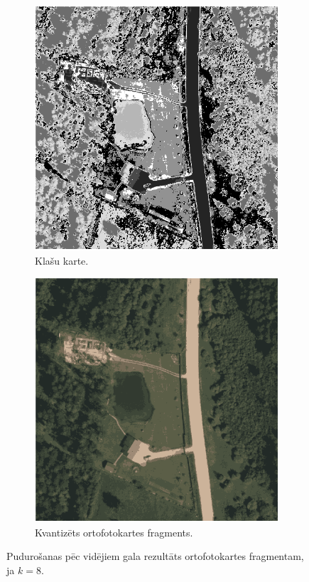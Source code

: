 \documentclass[12pt,paper=a4]{report}
\begin{document}
\begin{figure}[h!]
\centering
\begin{subfigure}[b]{.4\linewidth}
\includegraphics[width=\linewidth]{map8part}
\caption{Klašu karte.}
\label{kmeans8map}
\end{subfigure}
\begin{subfigure}[b]{.4\linewidth}
\includegraphics[width=\linewidth]{ImgQ8part}
\caption{Kvantizēts ortofotokartes fragments.}
\label{kmeans8imgq}
\end{subfigure}
\caption{Pudurošanas pēc vidējiem gala rezultāts ortofotokartes fragmentam, ja $k=8$.}
\label{fig:kmeans8}
\end{figure}
\end{document}
